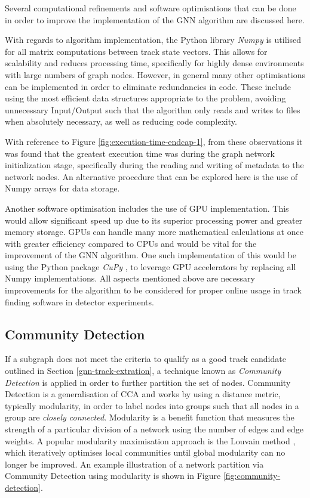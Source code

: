 Several computational refinements and software optimisations that can be done in order to improve the implementation of the GNN algorithm are discussed here.

With regards to algorithm implementation, the Python library \textit{Numpy} \cite{harris2020array} is utilised for all matrix computations between track state vectors. This allows for scalability and reduces processing time, specifically for highly dense environments with large numbers of graph nodes. However, in general many other optimisations can be implemented in order to eliminate redundancies in code. These include using the most efficient data structures appropriate to the problem, avoiding unnecessary Input/Output such that the algorithm only reads and writes to files when absolutely necessary, as well as reducing code complexity.

With reference to Figure \ref{fig:execution-time-endcap-1}, from these observations it was found that the greatest execution time was during the graph network initialization stage, specifically during the reading and writing of metadata to the network nodes. An alternative procedure that can be explored here is the use of Numpy arrays for data storage.

Another software optimisation includes the use of GPU implementation. This would allow significant speed up due to its superior processing power and greater memory storage. GPUs can handle many more mathematical calculations at once with greater efficiency compared to CPUs and would be vital for the improvement of the GNN algorithm. One such implementation of this would be using the Python package \textit{CuPy} \cite{cupy_learningsys2017}, to leverage GPU accelerators by replacing all Numpy implementations. All aspects mentioned above are necessary improvements for the algorithm to be considered for proper online usage in track finding software in detector experiments.







\subsection{Community Detection}

If a subgraph does not meet the criteria to qualify as a good track candidate outlined in Section \ref{gnn-track-extration}, a technique known as \textit{Community Detection} \cite{community} is applied in order to further partition the set of nodes. Community Detection is a generalisation of CCA and works by using a distance metric, typically modularity, in order to label nodes into groups such that all nodes in a group are \textit{closely connected}. Modularity is a benefit function that measures the strength of a particular division of a network using the number of edges and edge weights. A popular modularity maximisation approach is the Louvain method \cite{python_louvain}, which iteratively optimises local communities until global modularity can no longer be improved. An example illustration of a network partition via Community Detection using modularity is shown in Figure \ref{fig:community-detection}. 

